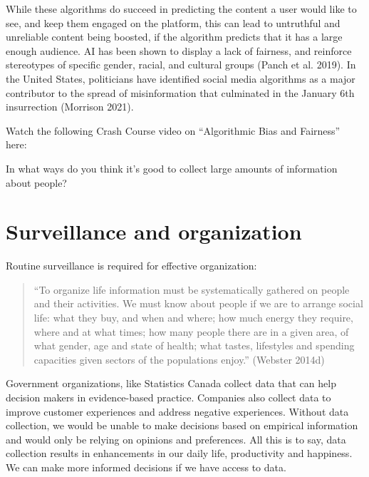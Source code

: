 \documentclass[
  letterpaper,
  DIV=11,
  numbers=noendperiod]{scrreprt}
\begin{document}
While these algorithms do succeed in predicting the content a user would
like to see, and keep them engaged on the platform, this can lead to
untruthful and unreliable content being boosted, if the algorithm
predicts that it has a large enough audience. AI has been shown to
display a lack of fairness, and reinforce stereotypes of specific
gender, racial, and cultural groups (Panch et al. 2019). In the United
States, politicians have identified social media algorithms as a major
contributor to the spread of misinformation that culminated in the
January 6th insurrection (Morrison 2021).

Watch the following Crash Course video on ``Algorithmic Bias and
Fairness'' here:~

\begin{tcolorbox}[enhanced jigsaw, arc=.35mm, bottomrule=.15mm, bottomtitle=1mm, breakable, colback=white, colbacktitle=quarto-callout-tip-color!10!white, colframe=quarto-callout-tip-color-frame, coltitle=black, left=2mm, leftrule=.75mm, opacityback=0, opacitybacktitle=0.6, rightrule=.15mm, title=\textcolor{quarto-callout-tip-color}{\faLightbulb}\hspace{0.5em}{Pause and reflect}, titlerule=0mm, toprule=.15mm, toptitle=1mm]

In what ways do you think it's good to collect large amounts of
information about people?~~~

\end{tcolorbox}

\section{Surveillance and
organization}\label{surveillance-and-organization}

Routine surveillance is required for effective organization:~

\begin{quote}
``To organize life information must be systematically gathered on people
and their activities. We must know about people if we are to arrange
social life: what they buy, and when and where; how much energy they
require, where and at what times; how many people there are in a given
area, of what gender, age and state of health; what tastes, lifestyles
and spending capacities given sectors of the populations enjoy.''
(Webster 2014d)
\end{quote}

Government organizations, like Statistics Canada collect data that can
help decision makers in evidence-based practice. Companies also collect
data to improve customer experiences and address negative experiences.
Without data collection, we would be unable to make decisions based on
empirical information and would only be relying on opinions and
preferences. All this is to say, data collection results in enhancements
in our daily life, productivity and happiness. We can make more informed
decisions if we have access to data.
\end{document}
